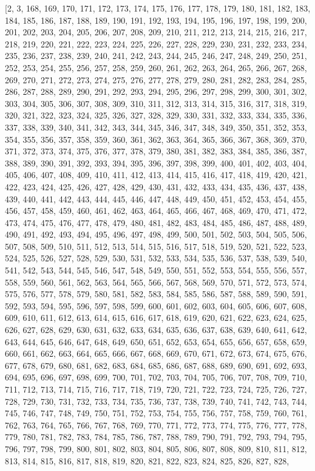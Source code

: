 \documentclass[11pt]{article}
\begin{document}
\begin{itemize}
    	 [2, 3, 168, 169, 170, 171, 172, 173, 174, 175, 176, 177, 178, 179, 180, 181, 182, 183, 184, 185, 186, 187, 188, 189, 190, 191, 192, 193, 194, 195, 196, 197, 198, 199, 200, 201, 202, 203, 204, 205, 206, 207, 208, 209, 210, 211, 212, 213, 214, 215, 216, 217, 218, 219, 220, 221, 222, 223, 224, 225, 226, 227, 228, 229, 230, 231, 232, 233, 234, 235, 236, 237, 238, 239, 240, 241, 242, 243, 244, 245, 246, 247, 248, 249, 250, 251, 252, 253, 254, 255, 256, 257, 258, 259, 260, 261, 262, 263, 264, 265, 266, 267, 268, 269, 270, 271, 272, 273, 274, 275, 276, 277, 278, 279, 280, 281, 282, 283, 284, 285, 286, 287, 288, 289, 290, 291, 292, 293, 294, 295, 296, 297, 298, 299, 300, 301, 302, 303, 304, 305, 306, 307, 308, 309, 310, 311, 312, 313, 314, 315, 316, 317, 318, 319, 320, 321, 322, 323, 324, 325, 326, 327, 328, 329, 330, 331, 332, 333, 334, 335, 336, 337, 338, 339, 340, 341, 342, 343, 344, 345, 346, 347, 348, 349, 350, 351, 352, 353, 354, 355, 356, 357, 358, 359, 360, 361, 362, 363, 364, 365, 366, 367, 368, 369, 370, 371, 372, 373, 374, 375, 376, 377, 378, 379, 380, 381, 382, 383, 384, 385, 386, 387, 388, 389, 390, 391, 392, 393, 394, 395, 396, 397, 398, 399, 400, 401, 402, 403, 404, 405, 406, 407, 408, 409, 410, 411, 412, 413, 414, 415, 416, 417, 418, 419, 420, 421, 422, 423, 424, 425, 426, 427, 428, 429, 430, 431, 432, 433, 434, 435, 436, 437, 438, 439, 440, 441, 442, 443, 444, 445, 446, 447, 448, 449, 450, 451, 452, 453, 454, 455, 456, 457, 458, 459, 460, 461, 462, 463, 464, 465, 466, 467, 468, 469, 470, 471, 472, 473, 474, 475, 476, 477, 478, 479, 480, 481, 482, 483, 484, 485, 486, 487, 488, 489, 490, 491, 492, 493, 494, 495, 496, 497, 498, 499, 500, 501, 502, 503, 504, 505, 506, 507, 508, 509, 510, 511, 512, 513, 514, 515, 516, 517, 518, 519, 520, 521, 522, 523, 524, 525, 526, 527, 528, 529, 530, 531, 532, 533, 534, 535, 536, 537, 538, 539, 540, 541, 542, 543, 544, 545, 546, 547, 548, 549, 550, 551, 552, 553, 554, 555, 556, 557, 558, 559, 560, 561, 562, 563, 564, 565, 566, 567, 568, 569, 570, 571, 572, 573, 574, 575, 576, 577, 578, 579, 580, 581, 582, 583, 584, 585, 586, 587, 588, 589, 590, 591, 592, 593, 594, 595, 596, 597, 598, 599, 600, 601, 602, 603, 604, 605, 606, 607, 608, 609, 610, 611, 612, 613, 614, 615, 616, 617, 618, 619, 620, 621, 622, 623, 624, 625, 626, 627, 628, 629, 630, 631, 632, 633, 634, 635, 636, 637, 638, 639, 640, 641, 642, 643, 644, 645, 646, 647, 648, 649, 650, 651, 652, 653, 654, 655, 656, 657, 658, 659, 660, 661, 662, 663, 664, 665, 666, 667, 668, 669, 670, 671, 672, 673, 674, 675, 676, 677, 678, 679, 680, 681, 682, 683, 684, 685, 686, 687, 688, 689, 690, 691, 692, 693, 694, 695, 696, 697, 698, 699, 700, 701, 702, 703, 704, 705, 706, 707, 708, 709, 710, 711, 712, 713, 714, 715, 716, 717, 718, 719, 720, 721, 722, 723, 724, 725, 726, 727, 728, 729, 730, 731, 732, 733, 734, 735, 736, 737, 738, 739, 740, 741, 742, 743, 744, 745, 746, 747, 748, 749, 750, 751, 752, 753, 754, 755, 756, 757, 758, 759, 760, 761, 762, 763, 764, 765, 766, 767, 768, 769, 770, 771, 772, 773, 774, 775, 776, 777, 778, 779, 780, 781, 782, 783, 784, 785, 786, 787, 788, 789, 790, 791, 792, 793, 794, 795, 796, 797, 798, 799, 800, 801, 802, 803, 804, 805, 806, 807, 808, 809, 810, 811, 812, 813, 814, 815, 816, 817, 818, 819, 820, 821, 822, 823, 824, 825, 826, 827, 828, 
\end{itemize}
\end{document}
